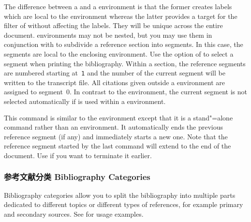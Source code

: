 \begin{ltxsyntax}


The difference between a  and a  environment is that the former creates labels which are local to the environment whereas the latter provides a target for the  filter of  without affecting the labels. They will be unique across the entire document.  environments may not be nested, but you may use them in conjunction with  to subdivide a reference section into segments. In this case, the segments are local to the enclosing  environment. Use the  option of  to select a segment when printing the bibliography. Within a section, the reference segments are numbered starting at~\texttt{1} and the number of the current segment will be written to the transcript file. All citations given outside a  environment are assigned to segment~0. In contrast to the  environment, the current segment is not selected automatically if  is used within a  environment.


This command is similar to the  environment except that it is a stand"=alone command rather than an environment. It automatically ends the previous reference segment (if any) and immediately starts a new one. Note that the reference segment started by the last  command will extend to the end of the document. Use  if you want to terminate it earlier.

\end{ltxsyntax}

\subsubsection{参考文献分类 Bibliography Categories}
\label{use:bib:cat}

Bibliography categories allow you to split the bibliography into multiple parts dedicated to different topics or different types of references, for example primary and secondary sources. See  for usage examples.

